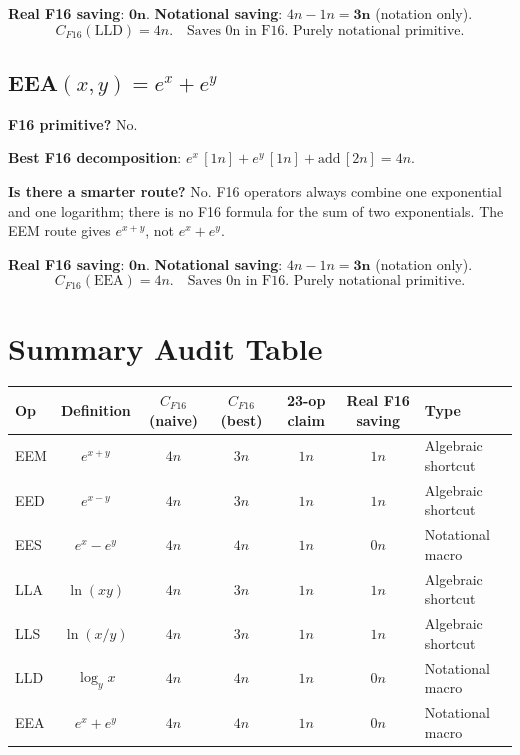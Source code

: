 \documentclass[11pt]{article}
\begin{document}
\textbf{Real F16 saving}: $\mathbf{0n}$.
\textbf{Notational saving}: $4n - 1n = \mathbf{3n}$ (notation only).
\[
\boxed{C_{F16}(\mathrm{LLD}) = 4n.\quad\text{Saves 0n in F16. Purely notational primitive.}}
\]

\subsection{EEA$(x,y) = e^x + e^y$}

\textbf{F16 primitive?} No.

\textbf{Best F16 decomposition}:
$e^x\,[1n] + e^y\,[1n] + \mathrm{add}\,[2n] = 4n$.

\textbf{Is there a smarter route?} No. F16 operators always combine one exponential and
one logarithm; there is no F16 formula for the sum of two exponentials.
The EEM route gives $e^{x+y}$, not $e^x+e^y$.

\textbf{Real F16 saving}: $\mathbf{0n}$.
\textbf{Notational saving}: $4n - 1n = \mathbf{3n}$ (notation only).
\[
\boxed{C_{F16}(\mathrm{EEA}) = 4n.\quad\text{Saves 0n in F16. Purely notational primitive.}}
\]

\section{Summary Audit Table}

\begin{center}
\renewcommand{\arraystretch}{1.3}
\begin{tabular}{lcccccl}
\toprule
Op & Definition & $C_{F16}$(naive) & $C_{F16}$(best) & 23-op claim & Real F16 saving & Type \\
\midrule
EEM & $e^{x+y}$ & $4n$ & $3n$ & $1n$ & $1n$ & Algebraic shortcut \\
EED & $e^{x-y}$ & $4n$ & $3n$ & $1n$ & $1n$ & Algebraic shortcut \\
EES & $e^x-e^y$ & $4n$ & $4n$ & $1n$ & $0n$ & Notational macro \\
LLA & $\ln(xy)$ & $4n$ & $3n$ & $1n$ & $1n$ & Algebraic shortcut \\
LLS & $\ln(x/y)$ & $4n$ & $3n$ & $1n$ & $1n$ & Algebraic shortcut \\
LLD & $\log_y x$ & $4n$ & $4n$ & $1n$ & $0n$ & Notational macro \\
EEA & $e^x+e^y$ & $4n$ & $4n$ & $1n$ & $0n$ & Notational macro \\
\bottomrule
\end{tabular}
\end{center}
\end{document}
